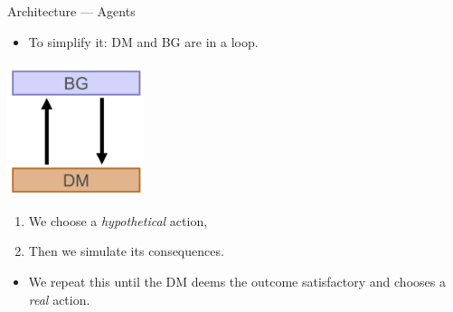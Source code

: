 \documentclass{beamer}
\begin{document}
   \begin{frame}{Architecture --- Agents}
      \begin{itemize}
         \item To simplify it: DM and BG are in a loop.
      \end{itemize}
      
      \begin{center}
         \includegraphics[width=0.3\textwidth]{bg_dm_loop.png}
      \end{center}
      
      \begin{enumerate}
         \item We choose a \emph{hypothetical} action,
         \item Then we simulate its consequences.
      \end{enumerate}
      
      \begin{itemize}
         \item We repeat this until the DM deems the outcome satisfactory and chooses a \emph{real} action.
      \end{itemize}
   \end{frame}
   
\end{document}
